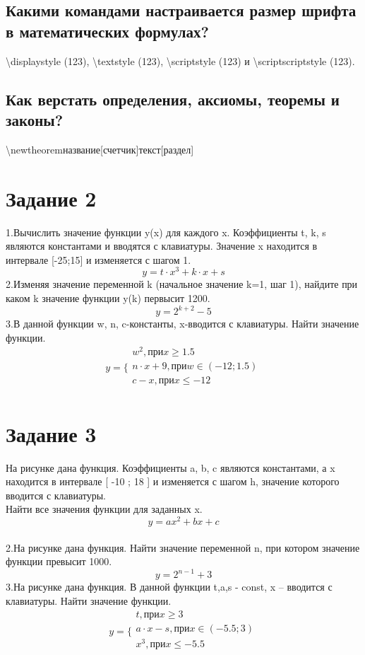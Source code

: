 \documentclass[a4paper,12pt]{article} %
\begin{document}
\subsection{Какими командами настраивается размер шрифта в математических формулах?}
\textbackslash displaystyle (123), \textbackslash textstyle (123),  \textbackslash scriptstyle (123) и \textbackslash scriptscriptstyle (123).

\subsection{Как верстать определения, аксиомы, теоремы и законы?}
\textbackslash newtheorem{название}[счетчик]{текст}[раздел]
\section{Задание 2}
1.Вычислить значение функции y(x) для каждого x. Коэффициенты t, k, s являются константами и вводятся с клавиатуры. Значение x находится в интервале [-25;15] и изменяется с шагом 1.\\
\[
{y = t \cdot x^3 + k \cdot x + s}
\]
2.Изменяя значение переменной k (начальное значение k=1, шаг 1), найдите при каком k значение функции y(k) первысит 1200.\\
\[
{y = 2^{k+2} - 5}
\]
3.В данной функции w, n, c-константы, x-вводится с клавиатуры. Найти значение функции.\\
 \[
{y} = \{
\begin{array}{cc}
{w^2, {при }  x \geqslant 1.5} \\
{ n \cdot x + 9, {при } w \in (-12;1.5)}\\
{c-x, {при } x \leqslant -12} \\
\end{array}
 \]
\section{Задание 3}
На рисунке дана функция. Коэффициенты a, b, c являются константами, а x находится в интервале [ -10 ; 18 ] и изменяется с шагом h, значение которого вводится с клавиатуры. \\
Найти все значения функции для заданных x. \\
\[
y = a x^2 + b x+ c 
\] \\
 2.На рисунке дана функция. Найти значение переменной n, при котором значение
 функции превысит 1000.
\[
y = 2^{n-1} + 3
\] 
 3.На рисунке дана функция. В данной функции t,a,s - const, x -- вводится с клавиатуры. Найти значение функции.
 \[
 {y} = \{
\begin{array}{ll}
{t, { при }  x \geqslant 3} \\
{ a \cdot x - s, { при } x \in (-5.5; 3)}\\
{ x^3, { при } x \leqslant -5.5} \\
\end{array}
 \]
\end{document}
